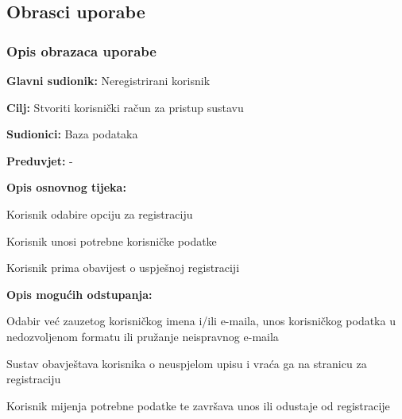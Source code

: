 			\eject 
			
			
				
			\subsection{Obrasci uporabe}
				
				\subsubsection{Opis obrazaca uporabe}

					\noindent {}
					\begin{packed_item}
	
						\item \textbf{Glavni sudionik:} Neregistrirani korisnik
						\item  \textbf{Cilj:} Stvoriti korisnički račun za pristup sustavu
						\item  \textbf{Sudionici:} Baza podataka
						\item  \textbf{Preduvjet:} -
						\item  \textbf{Opis osnovnog tijeka:}
						
						\item[] \begin{packed_enum}
	
							\item Korisnik odabire opciju za registraciju
							\item Korisnik unosi potrebne korisničke podatke
							\item Korisnik prima obavijest o uspješnoj registraciji
						\end{packed_enum}
						
						\item  \textbf{Opis mogućih odstupanja:}
						
						\item[] \begin{packed_item}
	
							\item[2.a] Odabir već zauzetog korisničkog imena i/ili e-maila, unos korisničkog podatka u nedozvoljenom formatu ili pružanje neispravnog e-maila
							\item[] \begin{packed_enum}
								
								\item Sustav obavještava korisnika o neuspjelom upisu i vraća ga na stranicu za registraciju
								\item Korisnik mijenja potrebne podatke te završava unos ili odustaje od registracije
								
							\end{packed_enum}
							
						\end{packed_item}
					\end{packed_item}
					

